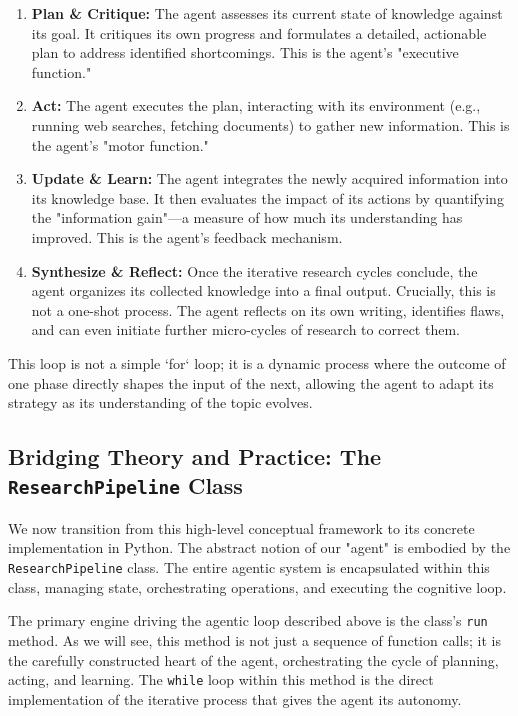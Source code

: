 \documentclass[12pt, a4paper]{article}
\begin{document}
\begin{enumerate}
    \item \textbf{Plan \& Critique:} The agent assesses its current state of knowledge against its goal. It critiques its own progress and formulates a detailed, actionable plan to address identified shortcomings. This is the agent's "executive function."
    \item \textbf{Act:} The agent executes the plan, interacting with its environment (e.g., running web searches, fetching documents) to gather new information. This is the agent's "motor function."
    \item \textbf{Update \& Learn:} The agent integrates the newly acquired information into its knowledge base. It then evaluates the impact of its actions by quantifying the "information gain"—a measure of how much its understanding has improved. This is the agent's feedback mechanism.
    \item \textbf{Synthesize \& Reflect:} Once the iterative research cycles conclude, the agent organizes its collected knowledge into a final output. Crucially, this is not a one-shot process. The agent reflects on its own writing, identifies flaws, and can even initiate further micro-cycles of research to correct them.
\end{enumerate}

This loop is not a simple `for` loop; it is a dynamic process where the outcome of one phase directly shapes the input of the next, allowing the agent to adapt its strategy as its understanding of the topic evolves.

\subsection{Bridging Theory and Practice: The \texttt{ResearchPipeline} Class}
We now transition from this high-level conceptual framework to its concrete implementation in Python. The abstract notion of our "agent" is embodied by the \texttt{ResearchPipeline} class. The entire agentic system is encapsulated within this class, managing state, orchestrating operations, and executing the cognitive loop.

The primary engine driving the agentic loop described above is the class's \texttt{run} method. As we will see, this method is not just a sequence of function calls; it is the carefully constructed heart of the agent, orchestrating the cycle of planning, acting, and learning. The \texttt{while} loop within this method is the direct implementation of the iterative process that gives the agent its autonomy.
\end{document}
